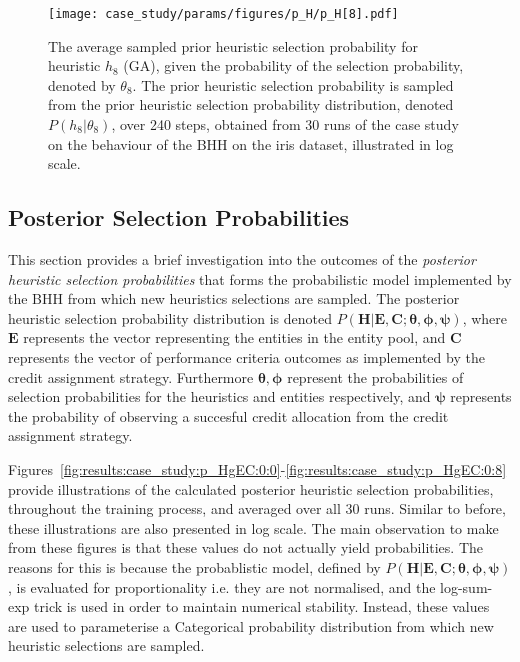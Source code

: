\begin{figure}[htpb]
	\centering
	\texttt{[image: case\_study/params/figures/p\_H/p\_H[8].pdf]}
	\caption{The average sampled prior heuristic selection probability for heuristic $h_{8}$ (\acs{GA}), given the probability of the selection probability, denoted by $\theta_{8}$. The prior heuristic selection probability is sampled from the prior heuristic selection probability distribution, denoted $P(h_{8} \vert \theta_{8})$, over 240 steps, obtained from 30 runs of the case study on the behaviour of the \acs{BHH} on the iris dataset, illustrated in log scale.}
	\label{fig:results:case_study:p_H:8}
\end{figure}


\subsection{Posterior Selection Probabilities}\label{sec:results:case_study:posterior_selec_prob}

This section provides a brief investigation into the outcomes of the \textit{posterior heuristic selection probabilities} that forms the probabilistic model implemented by the \acs{BHH} from which new heuristics selections are sampled. The posterior heuristic selection probability distribution is denoted $P(\boldsymbol{H} \vert \boldsymbol{E}, \boldsymbol{C}; \boldsymbol{\theta}, \boldsymbol{\phi}, \boldsymbol{\psi})$, where $\boldsymbol{E}$ represents the vector representing the entities in the entity pool, and $\boldsymbol{C}$ represents the vector of performance criteria outcomes as implemented by the credit assignment strategy. Furthermore $\boldsymbol{\theta}, \boldsymbol{\phi}$ represent the probabilities of selection probabilities for the heuristics and entities respectively, and $\boldsymbol{\psi}$ represents the probability of observing a succesful credit allocation from the credit assignment strategy.

Figures~\ref{fig:results:case_study:p_HgEC:0:0}-\ref{fig:results:case_study:p_HgEC:0:8} provide illustrations of the calculated posterior heuristic selection probabilities, throughout the training process, and averaged over all 30 runs. Similar to before, these illustrations are also presented in log scale. The main observation to make from these figures is that these values do not actually yield probabilities. The reasons for this is because the probablistic model, defined by $P(\boldsymbol{H} \vert \boldsymbol{E}, \boldsymbol{C}; \boldsymbol{\theta}, \boldsymbol{\phi}, \boldsymbol{\psi})$, is evaluated for proportionality i.e. they are not normalised, and the log-sum-exp trick is used in order to maintain numerical stability. Instead, these values are used to parameterise a Categorical probability distribution from which new heuristic selections are sampled.

